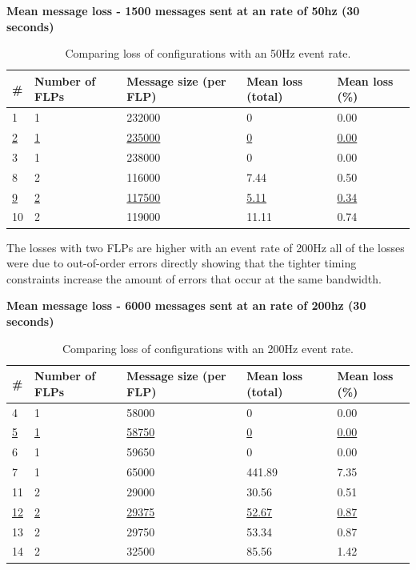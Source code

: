 \documentclass[]{article}
\begin{document}
\begin{table}[H]
	\textbf{Mean message loss - 1500 messages sent at an rate of 50hz (30 seconds)}	
	\begin{center}
		\begin{tabularx}{\textwidth}{ | X | X | X | X | X | }
			\hline
			\textbf{\#} & \textbf{Number of FLPs} & \textbf{Message size (per FLP)} & \textbf{Mean loss (total)} & \textbf{Mean loss (\%)} \\ \hline
			
			1 & 1 & 232000 & 0 & 0.00 \\ \hline
			\underline{2} & \underline{1} & \underline{235000} & \underline{0} & \underline{0.00} \\ \hline
			3 & 1 & 238000 & 0 & 0.00 \\ \hline
			8 & 2 & 116000 & 7.44 & 0.50 \\ \hline
			\underline{9} & \underline{2} & \underline{117500} & \underline{5.11} & \underline{0.34}\\ \hline
			10 & 2 & 119000 & 11.11 & 0.74 \\ \hline
		\end{tabularx}
		\caption{Comparing loss of configurations with an 50Hz event rate.}
		\label{tab:resultsroundone}
	\end{center}
\end{table}

The losses with two FLPs are higher with an event rate of 200Hz all of the losses were due to out-of-order errors directly  showing that the tighter timing constraints increase the amount of errors that occur at the same bandwidth.

\begin{table}[H]
	\textbf{Mean message loss - 6000 messages sent at an rate of 200hz (30 seconds)}	
	\begin{center}
		\begin{tabularx}{\textwidth}{ | X | X | X | X | X | }
			\hline
			\textbf{\#} & \textbf{Number of FLPs} & \textbf{Message size (per FLP)} & \textbf{Mean loss (total)} & \textbf{Mean loss (\%)} \\ \hline
			
			4 & 1 & 58000 & 0 & 0.00 \\ \hline
			\underline{5} & \underline{1} & \underline{58750} & \underline{0} & \underline{0.00} \\ \hline
			6 & 1 & 59650 & 0 & 0.00 \\ \hline
			7 & 1 & 65000 & 441.89 & 7.35 \\ \hline
			11 & 2 & 29000 & 30.56 & 0.51 \\ \hline
			\underline{12} & \underline{2} & \underline{29375} & \underline{52.67} & \underline{0.87}\\ \hline
			13 & 2 & 29750 & 53.34 & 0.87 \\ \hline
			14 & 2 & 32500 & 85.56 & 1.42 \\ \hline
		\end{tabularx}
		\caption{Comparing loss of configurations with an 200Hz event rate.}
		\label{tab:resultsroundtwo}
	\end{center}
\end{table}
\end{document}
